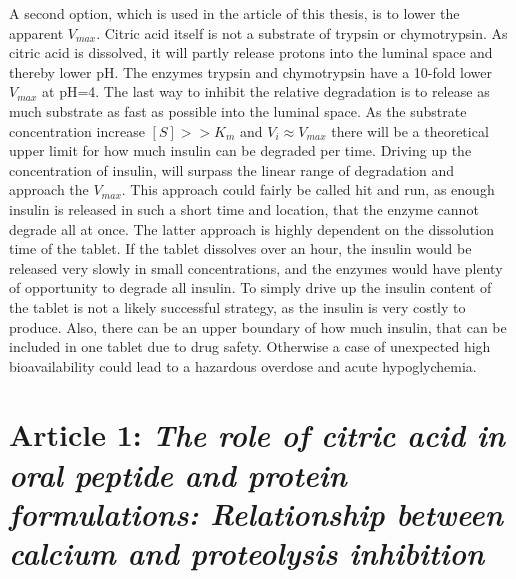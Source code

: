 A second option, which is used in the article \cite{welling2014citric} of this thesis, is to lower the apparent $V_{max}$. Citric acid itself is not a substrate of trypsin or chymotrypsin. As citric acid is dissolved, it will partly release protons into the luminal space and thereby lower pH. The enzymes trypsin and chymotrypsin have a 10-fold lower $V_{max}$ at pH=4.
The last way to inhibit the relative degradation is to release as much substrate as fast as possible into the luminal space. As the substrate concentration increase $[S] >> K_m$ and $V_i \approx V_{max}$ there will be a theoretical upper limit for how much insulin can be degraded per time. Driving up the concentration of insulin, will surpass the linear range of degradation and approach the $V_{max}$. This approach could fairly be called hit and run, as enough insulin is released in such a short time and location, that the enzyme cannot degrade all at once. The latter approach is highly dependent on the dissolution time of the tablet. If the tablet dissolves over an hour, the insulin would be released very slowly in small concentrations, and the enzymes would have plenty of opportunity to degrade all insulin. To simply drive up the insulin content of the tablet is not a likely successful strategy, as the insulin is very costly to produce. Also, there can be an upper boundary of how much insulin, that can be included in one tablet due to drug safety. Otherwise a case of unexpected high bioavailability could lead to a hazardous overdose and acute hypoglychemia.

\section{Article 1: \textit{The role of citric acid in oral peptide and protein formulations: Relationship between calcium and proteolysis inhibition}}
\label{article:citric}
\newpage
